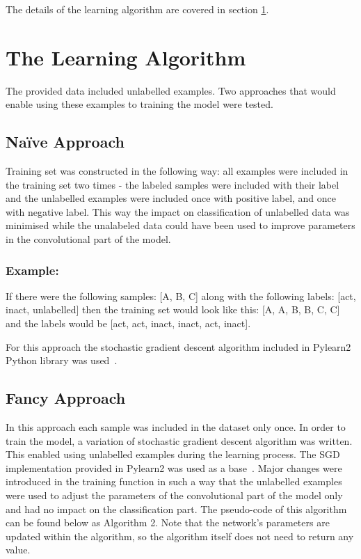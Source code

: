 \documentclass[a4paper,10pt]{report}
\begin{document}
	
	The details of the learning algorithm are covered in section \ref{sec:learning_algorithm}.	
	
      
    \section{The Learning Algorithm}\label{sec:learning_algorithm} 
    The provided data included unlabelled examples. Two approaches that would enable using these examples to training the model were tested. 
    
      \subsection{Na\"{i}ve Approach}
      Training set was constructed in the following way: all examples were included in the training set two times - the labeled samples were included with their label and the unlabelled examples were included once with positive label, and once with negative label. This way the impact on classification of unlabelled data was minimised while the unalabeled data could have been used to improve parameters in the convolutional part of the model. 
	  
      \subsubsection{Example:}
      If there were the following samples: [A, B, C] along with the following labels: [act, inact, unlabelled] then the training set would look like this: [A, A, B, B, C, C] and the labels would be [act, act, inact, inact, act, inact]. 
      
    For this approach the stochastic gradient descent algorithm included in Pylearn2 Python library was used~\cite{Pylearn2}. 
	  
      \subsection{Fancy Approach}
      In this approach each sample was included in the dataset only once. In order to train the model, a variation of stochastic gradient descent algorithm was written. This enabled using unlabelled examples during the learning process. The SGD implementation provided in Pylearn2 was used as a base~\cite{Pylearn2}. Major changes were introduced in the training function in such a way that the unlabelled examples were used to adjust the parameters of the convolutional part of the model only and had no impact on the classification part. The pseudo-code of this algorithm can be found below as Algorithm 2. Note that the network's parameters are updated within the algorithm, so the algorithm itself does not need to return any value.
      
\end{document}
